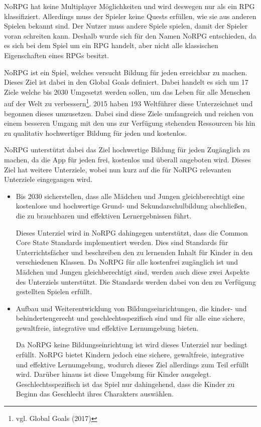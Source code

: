 NoRPG hat keine Multiplayer Möglichkeiten und wird deswegen nur als ein RPG klassifiziert. Allerdings muss der Spieler keine Quests erfüllen, wie sie aus anderen Spielen bekannt sind. Der Nutzer muss andere Spiele spielen, damit der Spieler voran schreiten kann. Deshalb wurde sich für den Namen NoRPG entschieden, da es sich bei dem Spiel um ein RPG handelt, aber nicht alle klassischen Eigenschaften eines RPGs besitzt.
	
NoRPG ist ein Spiel, welches versucht Bildung für jeden erreichbar zu machen. Dieses Ziel ist dabei in den Global Goals definiert. Dabei handelt es sich um 17 Ziele welche bis 2030 Umgesetzt werden sollen, um das Leben für alle Menschen auf der Welt zu verbessern\footnote{vgl. Global Goals \cite{global} (2017)}. 2015 haben 193 Weltführer diese Unterzeichnet und begonnen dieses umzusetzen. Dabei sind diese Ziele umfangreich und reichen von einem besseren Umgang mit den uns zur Verfügung stehenden Ressourcen bis hin zu qualitativ hochwertiger Bildung für jeden und kostenlos.

NoRPG unterstützt dabei das Ziel hochwertige Bildung für jeden Zugänglich zu machen, da die App für jeden frei, kostenlos und überall angeboten wird. Dieses Ziel hat weitere Unterziele, wobei nun kurz auf die für NoRPG relevanten Unterziele eingegangen wird.

\begin{itemize}
\item Bis 2030 sicherstellen, dass alle Mädchen und Jungen gleichberechtigt eine kostenlose und hochwertige Grund- und Sekundarschulbildung abschließen, die zu brauchbaren und effektiven Lernergebnissen führt.

Dieses Unterziel wird in NoRPG dahingegen unterstützt, dass die Common Core State Standards implementiert werden. Dies sind Standards für Unterrichtsfächer und beschreiben den zu lernenden Inhalt für Kinder in den verschiedenen Klassen. Da NoRPG für alle kostenfrei zugänglich ist und Mädchen und Jungen gleichberechtigt sind, werden auch diese zwei Aspekte des Unterziels unterstützt. Die Standards werden dabei von den zu Verfügung gestellten Spielen erfüllt.

\item Aufbau und Weiterentwicklung von Bildungseinrichtungen, die kinder- und behindertengerecht und geschlechtsspezifisch sind und für alle eine sichere, gewaltfreie, integrative und effektive Lernumgebung bieten. %

Da NoRPG keine Bildungseinrichtung ist wird dieses Unterziel nur bedingt erfüllt. NoRPG bietet Kindern jedoch eine sichere, gewaltfreie, integrative und effektive Lernumgebung, wodurch dieses Ziel allerdings zum Teil erfüllt wird. Darüber hinaus ist diese Umgebung für Kinder ausgelegt. Geschlechtsspezifisch ist das Spiel nur dahingehend, dass die Kinder zu Beginn das Geschlecht ihres Charakters auswählen.

\end{itemize}


